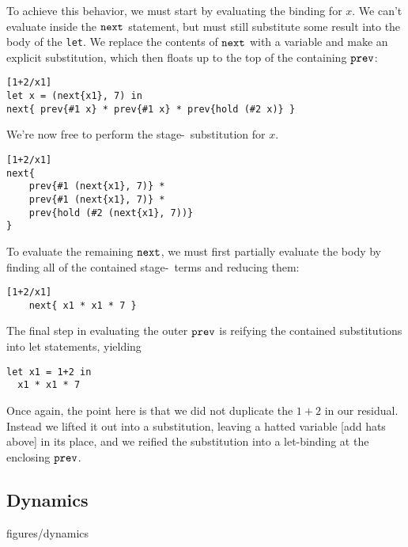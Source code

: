 
To achieve this behavior, we must start by evaluating the binding for $x$.  We can't evaluate inside the
${\tt next}$ statement, but must still substitute some result into the body of the
\texttt{let}. We replace the contents of ${\tt next}$ with a variable and make an
explicit substitution, which then floats up to the top of the containing
${\tt prev}$:
\begin{lstlisting} 
[1+2/x1]
let x = (next{x1}, 7) in
next{ prev{#1 x} * prev{#1 x} * prev{hold (#2 x)} }
\end{lstlisting}
We're now free to perform the stage-\bbone~substitution for $x$.  
\begin{lstlisting} 
[1+2/x1]
next{
	prev{#1 (next{x1}, 7)} *
	prev{#1 (next{x1}, 7)} *
	prev{hold (#2 (next{x1}, 7))}
}
\end{lstlisting}
To evaluate the remaining ${\tt next}$, we must first partially evaluate the body by finding all of the contained stage-\bbone~terms and reducing them:
\begin{lstlisting} 
[1+2/x1]
	next{ x1 * x1 * 7 }
\end{lstlisting}
The final step in evaluating the outer ${\tt prev}$ is reifying the contained substitutions into let statements, yielding
\begin{lstlisting} 
let x1 = 1+2 in
  x1 * x1 * 7
\end{lstlisting}

Once again, the point here is that we did not duplicate the $1+2$ in our residual.  
Instead we lifted it out into a substitution, leaving a hatted variable [\TODO add hats above] in its place,
and we reified the substitution into a let-binding at the enclosing ${\tt prev}$.

\subsection{Dynamics}

 {figures/dynamics}


